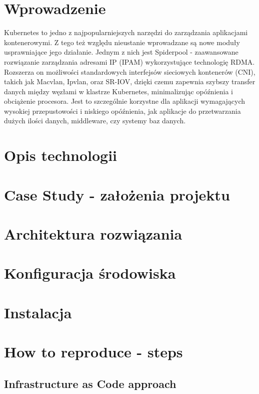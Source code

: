 \documentclass[onecolumn,12pt]{article}
\begin{document}
\tableofcontents
\thispagestyle{empty}
\newpage

\section{Wprowadzenie}
Kubernetes to jedno z najpopularniejszych narzędzi do zarządzania aplikacjami kontenerowymi. Z tego też względu nieustanie wprowadzane są nowe moduły usprawniające jego działanie. Jednym z nich jest Spiderpool - zaawansowane rozwiązanie zarządzania adresami IP (IPAM) wykorzystujące technologię RDMA. Rozszerza on możliwości standardowych interfejsów sieciowych kontenerów (CNI), takich jak Macvlan, Ipvlan, oraz SR-IOV, dzięki czemu zapewnia  szybszy transfer danych między węzłami w klastrze Kubernetes, minimalizując opóźnienia i obciążenie procesora. Jest to szczególnie korzystne dla aplikacji wymagających wysokiej przepustowości i niskiego opóźnienia, jak aplikacje do przetwarzania dużych ilości danych, middleware, czy systemy baz danych.

\section{Opis technologii}

\section{Case Study - założenia projektu}

\section{Architektura rozwiązania}

\section{Konfiguracja środowiska}

\section{Instalacja}

\section{How to reproduce - steps}

\subsection{Infrastructure as Code approach}
\end{document}
